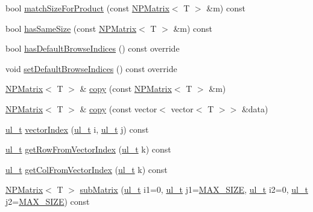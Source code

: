 \begin{DoxyCompactItemize}
bool \mbox{\hyperlink{class_n_p_matrix_a568a5ab1b6f0d51b3045dc8a81666209}{match\+Size\+For\+Product}} (const \mbox{\hyperlink{class_n_p_matrix}{N\+P\+Matrix}}$<$ T $>$ \&m) const
\item 
bool \mbox{\hyperlink{class_n_p_matrix_a8293f07a744e03121a57176c97bf452b}{has\+Same\+Size}} (const \mbox{\hyperlink{class_n_p_matrix}{N\+P\+Matrix}}$<$ T $>$ \&m) const
\item 
bool \mbox{\hyperlink{class_n_p_matrix_a500e7eb470961e8c855ab52264a2c3be}{has\+Default\+Browse\+Indices}} () const override
\item 
void \mbox{\hyperlink{class_n_p_matrix_a58e138e518c03a4f9751fafdf7e43bcb}{set\+Default\+Browse\+Indices}} () const override
\item 
\mbox{\hyperlink{class_n_p_matrix}{N\+P\+Matrix}}$<$ T $>$ \& \mbox{\hyperlink{class_n_p_matrix_ad2420de13cf39828daf36fd74aea9d2d}{copy}} (const \mbox{\hyperlink{class_n_p_matrix}{N\+P\+Matrix}}$<$ T $>$ \&m)
\item 
\mbox{\hyperlink{class_n_p_matrix}{N\+P\+Matrix}}$<$ T $>$ \& \mbox{\hyperlink{class_n_p_matrix_aea56ed6b8852d53ddedce7d9f0ea5a08}{copy}} (const vector$<$ vector$<$ T $>$$>$ \&data)
\item 
\mbox{\hyperlink{group___n_algebra_ga1b140a2034db3f5dfe18a987745df43a}{ul\+\_\+t}} \mbox{\hyperlink{class_n_p_matrix_a1edc980b44c5b898ba3feb7d4f5ab625}{vector\+Index}} (\mbox{\hyperlink{group___n_algebra_ga1b140a2034db3f5dfe18a987745df43a}{ul\+\_\+t}} i, \mbox{\hyperlink{group___n_algebra_ga1b140a2034db3f5dfe18a987745df43a}{ul\+\_\+t}} j) const
\item 
\mbox{\hyperlink{group___n_algebra_ga1b140a2034db3f5dfe18a987745df43a}{ul\+\_\+t}} \mbox{\hyperlink{class_n_p_matrix_aa8f30ca3523d088186e8320f9e21b772}{get\+Row\+From\+Vector\+Index}} (\mbox{\hyperlink{group___n_algebra_ga1b140a2034db3f5dfe18a987745df43a}{ul\+\_\+t}} k) const
\item 
\mbox{\hyperlink{group___n_algebra_ga1b140a2034db3f5dfe18a987745df43a}{ul\+\_\+t}} \mbox{\hyperlink{class_n_p_matrix_a3ef7e9e257ba6119e369a9a3c633d35d}{get\+Col\+From\+Vector\+Index}} (\mbox{\hyperlink{group___n_algebra_ga1b140a2034db3f5dfe18a987745df43a}{ul\+\_\+t}} k) const
\item 
\mbox{\hyperlink{class_n_p_matrix}{N\+P\+Matrix}}$<$ T $>$ \mbox{\hyperlink{class_n_p_matrix_a1af1b395e03d5009666214eb7f954afb}{sub\+Matrix}} (\mbox{\hyperlink{group___n_algebra_ga1b140a2034db3f5dfe18a987745df43a}{ul\+\_\+t}} i1=0, \mbox{\hyperlink{group___n_algebra_ga1b140a2034db3f5dfe18a987745df43a}{ul\+\_\+t}} j1=\mbox{\hyperlink{_n_vector_8h_a0592dba56693fad79136250c11e5a7fe}{M\+A\+X\+\_\+\+S\+I\+ZE}}, \mbox{\hyperlink{group___n_algebra_ga1b140a2034db3f5dfe18a987745df43a}{ul\+\_\+t}} i2=0, \mbox{\hyperlink{group___n_algebra_ga1b140a2034db3f5dfe18a987745df43a}{ul\+\_\+t}} j2=\mbox{\hyperlink{_n_vector_8h_a0592dba56693fad79136250c11e5a7fe}{M\+A\+X\+\_\+\+S\+I\+ZE}}) const
$$
\end{DoxyCompactItemize}
